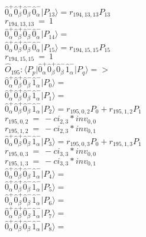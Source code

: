 \documentclass[14pt]{article}
\begin{document}
    $ \hat{0}_{\alpha}^{+}\hat{0}_{\beta}^{+}\hat{0}_{\beta}^{-}\hat{0}_{\alpha}^{-} \vert{P_{13}}\rangle = {r}_{194,13,13}P_{13} $ \\ 
    ${r}_{194,13,13}\ =\ 1 $ \\ 
    $ \hat{0}_{\alpha}^{+}\hat{0}_{\beta}^{+}\hat{0}_{\beta}^{-}\hat{0}_{\alpha}^{-} \vert{P_{14}}\rangle =  $ \\ 
    $ \hat{0}_{\alpha}^{+}\hat{0}_{\beta}^{+}\hat{0}_{\beta}^{-}\hat{0}_{\alpha}^{-} \vert{P_{15}}\rangle = {r}_{194,15,15}P_{15} $ \\ 
    ${r}_{194,15,15}\ =\ 1 $ \\ 
    
    $\hat{O}_{195}:  \langle{P_p}\vert \hat{0}_{\alpha}^{+}\hat{0}_{\beta}^{+}\hat{0}_{\beta}^{-}\hat{1}_{\alpha}^{-} \vert{P_q}\rangle => $ \\ 
    $ \hat{0}_{\alpha}^{+}\hat{0}_{\beta}^{+}\hat{0}_{\beta}^{-}\hat{1}_{\alpha}^{-} \vert{P_{0}}\rangle =  $ \\ 
    $ \hat{0}_{\alpha}^{+}\hat{0}_{\beta}^{+}\hat{0}_{\beta}^{-}\hat{1}_{\alpha}^{-} \vert{P_{1}}\rangle =  $ \\ 
    $ \hat{0}_{\alpha}^{+}\hat{0}_{\beta}^{+}\hat{0}_{\beta}^{-}\hat{1}_{\alpha}^{-} \vert{P_{2}}\rangle = {r}_{195,0,2}P_{0}+{r}_{195,1,2}P_{1} $ \\ 
    ${r}_{195,0,2}\ =\ -{ci}_{2,3}*{inv}_{0,0} $ \\ 
    ${r}_{195,1,2}\ =\ -{ci}_{2,3}*{inv}_{0,1} $ \\ 
    $ \hat{0}_{\alpha}^{+}\hat{0}_{\beta}^{+}\hat{0}_{\beta}^{-}\hat{1}_{\alpha}^{-} \vert{P_{3}}\rangle = {r}_{195,0,3}P_{0}+{r}_{195,1,3}P_{1} $ \\ 
    ${r}_{195,0,3}\ =\ -{ci}_{3,3}*{inv}_{0,0} $ \\ 
    ${r}_{195,1,3}\ =\ -{ci}_{3,3}*{inv}_{0,1} $ \\ 
    $ \hat{0}_{\alpha}^{+}\hat{0}_{\beta}^{+}\hat{0}_{\beta}^{-}\hat{1}_{\alpha}^{-} \vert{P_{4}}\rangle =  $ \\ 
    $ \hat{0}_{\alpha}^{+}\hat{0}_{\beta}^{+}\hat{0}_{\beta}^{-}\hat{1}_{\alpha}^{-} \vert{P_{5}}\rangle =  $ \\ 
    $ \hat{0}_{\alpha}^{+}\hat{0}_{\beta}^{+}\hat{0}_{\beta}^{-}\hat{1}_{\alpha}^{-} \vert{P_{6}}\rangle =  $ \\ 
    $ \hat{0}_{\alpha}^{+}\hat{0}_{\beta}^{+}\hat{0}_{\beta}^{-}\hat{1}_{\alpha}^{-} \vert{P_{7}}\rangle =  $ \\ 
    $ \hat{0}_{\alpha}^{+}\hat{0}_{\beta}^{+}\hat{0}_{\beta}^{-}\hat{1}_{\alpha}^{-} \vert{P_{8}}\rangle =  $ \\ 
\end{document}
